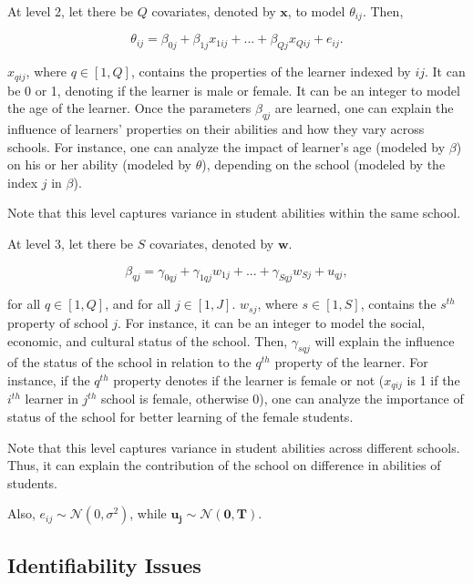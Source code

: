 \documentclass[12pt]{article}
\begin{document}
At level 2, let there be $Q$ covariates, denoted by $\boldsymbol{x}$, to model $\theta_{ij}$. Then,

\begin{equation}\label{second_level}
    \theta_{ij} = \beta_{0j} + \beta_{1j}x_{1ij} + ... + \beta_{Qj}x_{Qij} + e_{ij}.
\end{equation}

$x_{qij}$, where $q \in [1, Q]$, contains the properties of the learner indexed by $ij$. It can be 0 or 1, denoting if the learner is male or female. It can be an integer to model the age of the learner. Once the parameters $\beta_{qj}$ are learned, one can explain the influence of learners' properties on their abilities and how they vary across schools. For instance, one can analyze the impact of learner's age (modeled by $\beta$) on his or her ability (modeled by $\theta$), depending on the school (modeled by the index $j$ in $\beta$).

Note that this level captures variance in student abilities within the same school.

At level 3, let there be $S$ covariates, denoted by $\boldsymbol{w}$.

\begin{equation}
    \beta_{qj} = \gamma_{0qj} + \gamma_{1qj}w_{1j} + ... + \gamma_{Sqj}w_{Sj} + u_{qj},
\end{equation}

for all $q \in [1, Q]$, and for all $ j \in [1, J]$. $w_{sj}$, where $s \in [1, S]$, contains the $s^{th}$ property of school $j$. For instance, it can be an integer to model the social, economic, and cultural status of the school. Then, $\gamma_{sqj}$ will explain the influence of the status of the school in relation to the $q^{th}$ property of the learner. For instance, if the $q^{th}$ property denotes if the learner is female or not ($x_{qij}$ is 1 if the $i^{th}$ learner in $j^{th}$ school is female, otherwise 0), one can analyze the importance of status of the school for better learning of the female students.

Note that this level captures variance in student abilities across different schools. Thus, it can explain the contribution of the school on difference in abilities of students.

Also, $e_{ij} \sim \mathcal{N}(0, \sigma^2)$, while $\boldsymbol{u_j} \sim \mathcal{N}(\boldsymbol{0}, \boldsymbol{T})$.


\subsection{Identifiability Issues}
\end{document}
